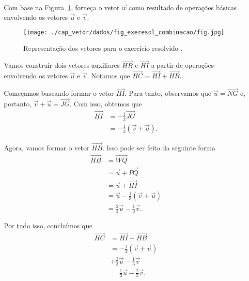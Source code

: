 \begin{exeresol}\label{cap_vetor_sec_op:exeresol:combinacao}
  Com base na Figura~\ref{cap_vector_sec_op:fig:exeresol_combinacao}, forneça o vetor $\vec{w}$ como resultado de operações básicas envolvendo os vetores $\vec{u}$ e $\vec{v}$.

  \begin{figure}[h]
    \centering
    \texttt{[image: ./cap\_vetor/dados/fig\_exeresol\_combinacao/fig.jpg]}
    \caption{Representação dos vetores para o exercício resolvido .}
    \label{cap_vector_sec_op:fig:exeresol_combinacao}
  \end{figure}

\end{exeresol}
\begin{resol}
  Vamos construir dois vetores auxiliares $\overrightarrow{HB}$ e $\overrightarrow{HI}$ a partir de operações envolvendo os vetores $\vec{u}$ e $\vec{v}$. Notamos que $\overrightarrow{HC} = \overrightarrow{HI} + \overrightarrow{HB}$.

  Começamos buscando formar o vetor $\overrightarrow{HI}$. Para tanto, observamos que $\vec{u}=\overrightarrow{NG}$ e, portanto, $\vec{v}+\vec{u}=\overrightarrow{JG}$. Com isso, obtemos que
  \begin{align}
    \overrightarrow{HI} &= -\frac{1}{3}\overrightarrow{JG} \\
                        &= -\frac{1}{3}(\vec{v}+\vec{u}).
  \end{align}

  Agora, vamos formar o vetor $\overrightarrow{HB}$. Isso pode ser feito da seguinte forma
  \begin{align}
    \overrightarrow{HB} &= \overrightarrow{WQ} \\
                        &= \vec{u} + \overrightarrow{PQ} \\
                        &= \vec{u} + \overrightarrow{HI} \\
                        &= \vec{u} -\frac{1}{3}(\vec{v}+\vec{u}) \\
                        &= \frac{2}{3}\vec{u} - \frac{1}{3}\vec{v}.
  \end{align}

  Por tudo isso, concluímos que
  \begin{align}
    \overrightarrow{HC} &= \overrightarrow{HI} + \overrightarrow{HB} \\
                        &= -\frac{1}{3}(\vec{v}+\vec{u}) \\
                        &+ \frac{2}{3}\vec{u} - \frac{1}{3}\vec{v} \\
                        &= \frac{1}{3}\vec{u} - \frac{2}{3}\vec{v}.
  \end{align}
\end{resol}

